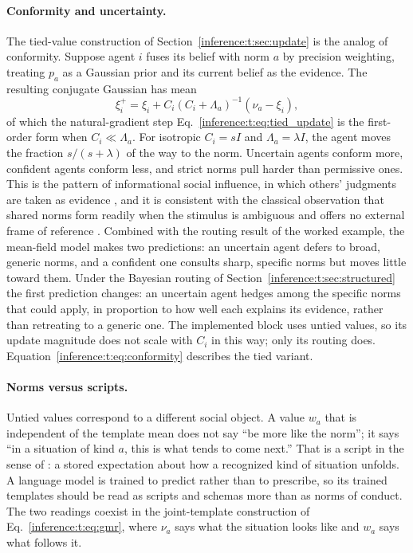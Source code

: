 \documentclass[11pt]{article}
\theoremstyle{definition}
\theoremstyle{remark}
\begin{document}
\paragraph{Conformity and uncertainty.}
The tied-value construction of Section~\ref{inference:t:sec:update} is the analog of conformity. Suppose agent $i$ fuses its belief with norm $a$ by precision weighting, treating $p_a$ as a Gaussian prior and its current belief as the evidence. The resulting conjugate Gaussian has mean
\begin{equation}
\xi_i^{+}=\xi_i+C_i(C_i+\Lambda_a)^{-1}(\nu_a-\xi_i),
\label{inference:t:eq:conformity}
\end{equation}
of which the natural-gradient step Eq.~\eqref{inference:t:eq:tied_update} is the first-order form when $C_i\ll\Lambda_a$. For isotropic $C_i=sI$ and $\Lambda_a=\lambda I$, the agent moves the fraction $s/(s+\lambda)$ of the way to the norm. Uncertain agents conform more, confident agents conform less, and strict norms pull harder than permissive ones. This is the pattern of informational social influence, in which others' judgments are taken as evidence \citep{inference:deutsch1955}, and it is consistent with the classical observation that shared norms form readily when the stimulus is ambiguous and offers no external frame of reference \citep{inference:sherif1936}. Combined with the routing result of the worked example, the mean-field model makes two predictions: an uncertain agent defers to broad, generic norms, and a confident one consults sharp, specific norms but moves little toward them. Under the Bayesian routing of Section~\ref{inference:t:sec:structured} the first prediction changes: an uncertain agent hedges among the specific norms that could apply, in proportion to how well each explains its evidence, rather than retreating to a generic one. The implemented block uses untied values, so its update magnitude does not scale with $C_i$ in this way; only its routing does. Equation~\eqref{inference:t:eq:conformity} describes the tied variant.

\paragraph{Norms versus scripts.}
Untied values correspond to a different social object. A value $w_a$ that is independent of the template mean does not say ``be more like the norm''; it says ``in a situation of kind $a$, this is what tends to come next.'' That is a script in the sense of \citep{inference:schank1977}: a stored expectation about how a recognized kind of situation unfolds. A language model is trained to predict rather than to prescribe, so its trained templates should be read as scripts and schemas more than as norms of conduct. The two readings coexist in the joint-template construction of Eq.~\eqref{inference:t:eq:gmr}, where $\nu_a$ says what the situation looks like and $w_a$ says what follows it.
\end{document}
